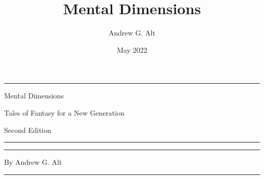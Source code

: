 \documentclass[12pt,openright,draft,titlepage]{bookmod}
\begin{document}
%
\sloppy

\author{Andrew G. Alt}
\title{Mental Dimensions}
\date{May 2022}




\frontmatter
\thispagestyle{empty}
\begin{center}
	\rule{4.5in}{2pt}

	\vspace{10pt}
	{\Huge Mental Dimensions}

	{\large Tales of Fantasy for a New Generation}

	{\small Second Edition}
	\rule{4.5in}{2pt}

	\vspace{3in}
	\rule{4.5in}{2pt}

	{\large By Andrew G. Alt}

	\rule{4.5in}{2pt}
\end{center}

\clearpage



\clearpage\thispagestyle{empty}
~\clearpage\thispagestyle{empty}
~\clearpage\thispagestyle{empty}

%



\thispagestyle{empty}
\setcounter{secnumdepth}{0}
\tableofcontents


\mainmatter\thispagestyle{empty}

\thispagestyle{empty}



















\backmatter
\end{document}
